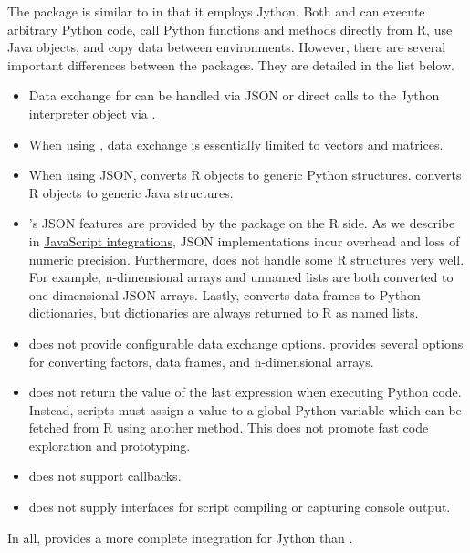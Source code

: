 The  package is similar to  in that it employs Jython. Both  and  can execute arbitrary Python code, call Python functions and methods directly from R, use Java objects, and copy data between environments. However, there are several important differences between the packages. They are detailed in the list below.

\begin{itemize}
\item Data exchange for  can be handled via JSON or direct calls to the Jython interpreter object via .

\item When using ,  data exchange is essentially limited to vectors and matrices.

\item When using JSON,  converts R objects to generic Python structures.  converts R objects to generic Java structures. 

\item {}'s JSON features are provided by the  package on the R side. As we describe in \hyperlink{javascriptintegrations}{JavaScript integrations}, JSON implementations incur overhead and loss of numeric precision. Furthermore,  does not handle some R structures very well. For example, n-dimensional arrays and unnamed lists are both converted to one-dimensional JSON arrays. Lastly,  converts data frames to Python dictionaries, but dictionaries are always returned to R as named lists.

\item {} does not provide configurable data exchange options.  provides several options for converting factors, data frames, and n-dimensional arrays.

\item {} does not return the value of the last expression when executing Python code. Instead, scripts must assign a value to a global Python variable which can be fetched from R using another  method. This does not promote fast code exploration and prototyping.

\item {} does not support callbacks.

\item {} does not supply interfaces for script compiling or capturing console output.
\end{itemize}
In all,  provides a more complete integration for Jython than .

